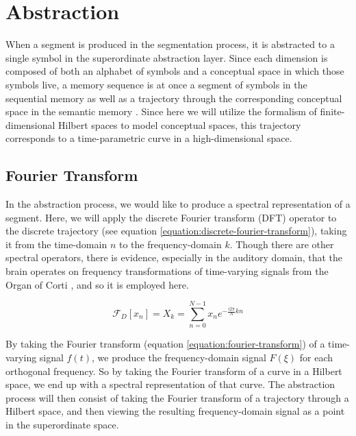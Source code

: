 \section{Abstraction}
\label{section:abstraction}

When a segment is produced in the segmentation process, it is abstracted to a single symbol in the superordinate abstraction layer.  Since each dimension is composed of both an alphabet of symbols and a conceptual space in which those symbols live, a memory sequence is at once a segment of symbols in the sequential memory as well as a trajectory through the corresponding conceptual space in the semantic memory \citep{wiggins2019learning}. Since here we will utilize the formalism of finite-dimensional Hilbert spaces to model conceptual spaces, this trajectory corresponds to a time-parametric curve in a high-dimensional space.

\subsection{Fourier Transform}
\label{section:fourier-transform}

In the abstraction process, we would like to produce a spectral representation of a segment.  Here, we will apply the discrete Fourier transform (DFT) operator \citep{cooley1965algorithm} to the discrete trajectory (see equation \ref{equation:discrete-fourier-transform}), taking it from the time-domain $n$ to the frequency-domain $k$.  Though there are other spectral operators, there is evidence, especially in the auditory domain, that the brain operates on frequency transformations of time-varying signals from the Organ of Corti \citep{moore2012introduction}, and so it is employed here.  

\begin{equation}
  \label{equation:discrete-fourier-transform}
  \mathcal{F}_D [x_n] = X_k = \sum_{n=0}^{N-1} x_n e^{-\frac{i 2 \pi}{N} kn}
\end{equation}

By taking the Fourier transform (equation \ref{equation:fourier-transform}) of a time-varying signal $f(t)$, we produce the frequency-domain signal $F(\xi)$ for each orthogonal frequency.  So by taking the Fourier transform of a curve in a Hilbert space, we end up with a spectral representation of that curve.  The abstraction process will then consist of taking the Fourier transform of a trajectory through a Hilbert space, and then viewing the resulting frequency-domain signal as a point in the superordinate space.

